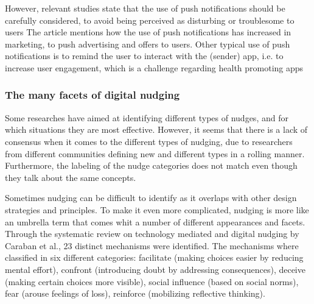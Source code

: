 However, relevant studies state that the use of push notifications should be carefully considered, to avoid being perceived as disturbing or troublesome to users \cite{warren_push_2014}
The article mentions how the use of push notifications has increased in marketing, to push advertising and offers to users. Other typical use of push notifications is to remind the user to interact with the (sender) app, i.e. to increase user engagement, which is a challenge regarding health promoting apps \cite{bidargaddi_prompt_2018}

\subsubsection{The many facets of digital nudging}
Some researches have aimed at identifying different types of nudges, and for which situations they are most effective. However, it seems that there is a lack of consensus when it comes to the different types of nudging, due to researchers from different communities defining new and different types in a rolling manner. Furthermore, the labeling of the nudge categories does not match even though they talk about the same concepts. 

Sometimes nudging can be difficult to identify as it overlaps with other design strategies and principles. To make it even more complicated, nudging is more like an umbrella term that comes whit a number of different appearances and facets. Through the systematic review on technology mediated and digital nudging by Caraban et al.\cite{caraban_23_2019}, 23 distinct mechanisms were identified. The mechanisms where classified in six different categories: facilitate (making choices easier by reducing mental effort), confront (introducing doubt by addressing consequences), deceive (making certain choices more visible), social influence (based on social norms), fear (arouse feelings of loss), reinforce (mobilizing reflective thinking). 

